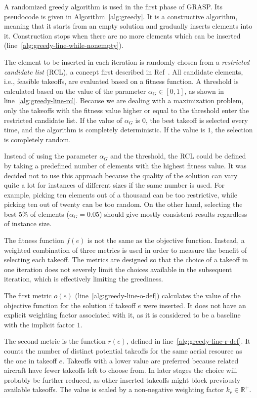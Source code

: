 A randomized greedy algorithm is used in the first phase of GRASP.
Its pseudocode is given in Algorithm~\ref{alg:greedy}.
It is a constructive algorithm, meaning that it starts from an empty solution and gradually inserts elements into it.
Construction stops when there are no more elements which can be inserted (line~\ref{alg:greedy-line-while-nonempty}).

The element to be inserted in each iteration is randomly chosen from a \textit{restricted candidate list} (RCL), a concept first described in Ref~\cite{Hart/RCL}.
All candidate elements, i.e., feasible takeoffs, are evaluated based on a fitness function.
A threshold is calculated based on the value of the parameter \hbox{$\alpha_G \in [ 0, 1 ]$}, as shown in line~\ref{alg:greedy-line-rcl}.
Because we are dealing with a maximization problem, only the takeoffs with the fitness value higher or equal to the threshold enter the restricted candidate list.
If the value of $\alpha_G$ is $0$, the best takeoff is selected every time, and the algorithm is completely deterministic.
If the value is $1$, the selection is completely random.

Instead of using the parameter $\alpha_G$ and the threshold, the RCL could be defined by taking a predefined number of elements with the highest fitness value.
It was decided not to use this approach because the quality of the solution can vary quite a lot for instances of different sizes if the same number is used.
For example, picking ten elements out of a thousand can be too restrictive, while picking ten out of twenty can be too random.
On the other hand, selecting the best $5\%$ of elements ($\alpha_G = 0.05$) should give mostly consistent results regardless of instance size.

The fitness function $f(e)$ is not the same as the objective function.
Instead, a weighted combination of three metrics is used in order to measure the benefit of selecting each takeoff.
The metrics are designed so that the choice of a takeoff in one iteration does not severely limit the choices available in the subsequent iteration, which is effectively limiting the greediness.

The first metric $o(e)$ (line~\ref{alg:greedy-line-o-def}) calculates the value of the objective function for the solution if takeoff $e$ were inserted.
It does not have an explicit weighting factor associated with it, as it is considered to be a baseline with the implicit factor $1$.

The second metric is the function $r(e)$, defined in line~\ref{alg:greedy-line-r-def}.
It counts the number of distinct potential takeoffs for the same aerial resource as the one in takeoff $e$.
Takeoffs with a lower value are preferred because related aircraft have fewer takeoffs left to choose from.
In later stages the choice will probably be further reduced, as other inserted takeoffs might block previously available takeoffs.
The value is scaled by a non-negative weighting factor $k_r \in \mathbb{R}^+$.

